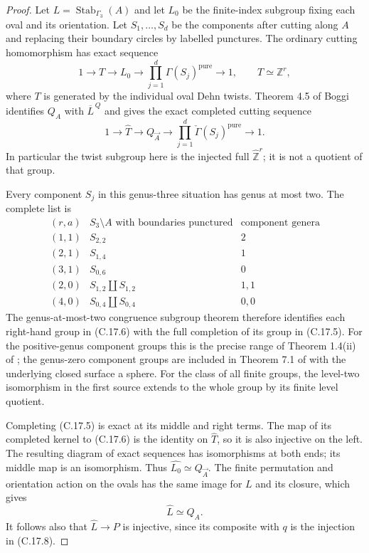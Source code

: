 \documentclass[11pt,oneside]{article}
\begin{document}
\begin{proof}
Let $L=\operatorname{Stab}_{\Gamma_3}(A)$ and let $L_0$ be
the finite-index subgroup fixing each oval and its orientation.
Let $S_1,\ldots,S_d$ be the components after cutting along
$A$ and replacing their boundary circles by labelled
punctures. The ordinary cutting homomorphism has exact
sequence
\[
 1\longrightarrow T\longrightarrow L_0
       \longrightarrow\prod_{j=1}^{d}\Gamma(S_j)^{\mathrm{pure}}
       \longrightarrow1,\qquad T\simeq\mathbb Z^r,
\tag{C.17.5}
\]
where $T$ is generated by the individual oval Dehn twists.
Theorem 4.5 of Boggi~\cite{CextraBoggiProcongruence2014}
identifies $Q_A$ with $\overline L^{\,Q}$ and gives the exact
completed cutting sequence
\[
 1\longrightarrow\widehat T\longrightarrow Q_{\vec A}
       \longrightarrow\prod_{j=1}^{d}
                  \check\Gamma(S_j)^{\mathrm{pure}}
       \longrightarrow1.
\tag{C.17.6}
\]
In particular the twist subgroup here is the injected full
$\widehat{\mathbb Z}^{r}$; it is not a quotient of that group.

Every component $S_j$ in this genus-three situation has genus
at most two. The complete list is
\[
\begin{array}{c|c|c}
 (r,a)&S_3\setminus A\text{ with boundaries punctured}
       &\text{component genera}\\ \hline
 (1,1)&S_{2,2}&2\\
 (2,1)&S_{1,4}&1\\
 (3,1)&S_{0,6}&0\\
 (2,0)&S_{1,2}\amalg S_{1,2}&1,1\\
 (4,0)&S_{0,4}\amalg S_{0,4}&0,0
\end{array}
\tag{C.17.7}
\]
The genus-at-most-two congruence subgroup theorem therefore
identifies each right-hand group in (C.17.6) with the full
completion of its group in (C.17.5). For the positive-genus
component groups this is the precise range of Theorem 1.4(ii)
of \cite{CextraBoggiCongruence2020}; the genus-zero component
groups are included in Theorem 7.1 of
\cite{CextraBoggiHyperelliptic} with the underlying closed
surface a sphere. For the class of all finite groups, the
level-two isomorphism in the first source extends to the
whole group by its finite level quotient.

Completing (C.17.5) is exact at its middle and right terms.
The map of its completed kernel to (C.17.6) is the identity
on $\widehat T$, so it is also injective on the left. The
resulting diagram of exact sequences has isomorphisms at
both ends; its middle map is an isomorphism. Thus
$\widehat{L_0}\simeq Q_{\vec A}$. The finite permutation and
orientation action on the ovals has the same image for
$L$ and its closure, which gives
\[
 \widehat L\simeq Q_A.
\tag{C.17.8}
\]
It follows also that $\widehat L\to P$ is injective, since
its composite with $q$ is the injection in (C.17.8).


\end{proof}
\end{document}
